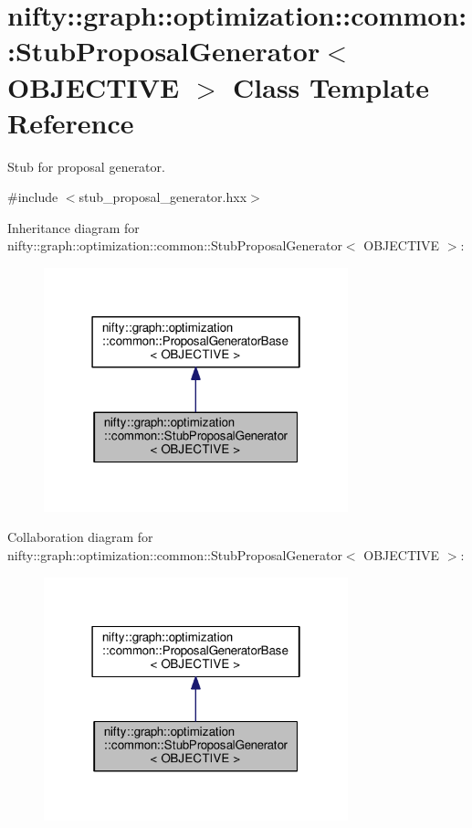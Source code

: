 \hypertarget{classnifty_1_1graph_1_1optimization_1_1common_1_1StubProposalGenerator}{}\section{nifty\+:\+:graph\+:\+:optimization\+:\+:common\+:\+:Stub\+Proposal\+Generator$<$ O\+B\+J\+E\+C\+T\+I\+V\+E $>$ Class Template Reference}
\label{classnifty_1_1graph_1_1optimization_1_1common_1_1StubProposalGenerator}


Stub for proposal generator.  




{\ttfamily \#include $<$stub\+\_\+proposal\+\_\+generator.\+hxx$>$}



Inheritance diagram for nifty\+:\+:graph\+:\+:optimization\+:\+:common\+:\+:Stub\+Proposal\+Generator$<$ O\+B\+J\+E\+C\+T\+I\+V\+E $>$\+:\nopagebreak
\begin{figure}[H]
\begin{center}
\leavevmode
\includegraphics[width=250pt]{classnifty_1_1graph_1_1optimization_1_1common_1_1StubProposalGenerator__inherit__graph}
\end{center}
\end{figure}


Collaboration diagram for nifty\+:\+:graph\+:\+:optimization\+:\+:common\+:\+:Stub\+Proposal\+Generator$<$ O\+B\+J\+E\+C\+T\+I\+V\+E $>$\+:\nopagebreak
\begin{figure}[H]
\begin{center}
\leavevmode
\includegraphics[width=250pt]{classnifty_1_1graph_1_1optimization_1_1common_1_1StubProposalGenerator__coll__graph}
\end{center}
\end{figure}
